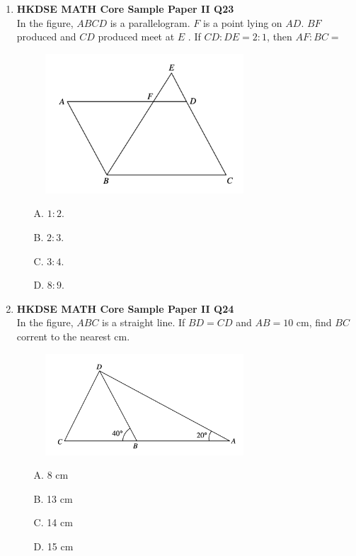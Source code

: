 \documentclass[12pt]{article}
\begin{document}
\begin{enumerate}
	\item \textbf{HKDSE MATH Core Sample Paper II Q23}\\
	In the figure, $ABCD$ is a parallelogram. $F$ is a point lying on $AD$. $BF$ produced and $CD$ produced meet at $E$ . If $CD : DE = 2 : 1$, then $AF : BC =$
	\begin{figure}[H]
		\centering
		\includegraphics[width = 0.7\textwidth]{SPFigure2.23.png}	
	\end{figure}
	\begin{enumerate}
		\item[A.] $1 : 2$.
		\item[B.] $2 : 3$.
		\item[C.] $3 : 4$.
		\item[D.] $8 : 9$.
	\end{enumerate}

	\item \textbf{HKDSE MATH Core Sample Paper II Q24}\\
	In the figure, $ABC$ is a straight line. If $BD = CD$ and $AB = 10$ cm, find $BC$ corrent to the nearest cm.
	\begin{figure}[H]
		\centering
		\includegraphics[width = 0.7\textwidth]{SPFigure2.24.png}	
	\end{figure}
	\begin{enumerate}
		\item[A.] 8 cm
		\item[B.] 13 cm
		\item[C.] 14 cm
		\item[D.] 15 cm
	\end{enumerate}


\end{enumerate}
\end{document}
